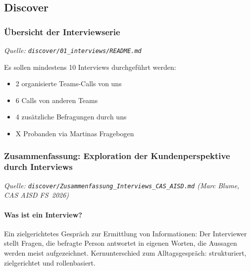 \clearpage
{}
\clearpage
{}

\clearpage
\pagecolor{anhangPastel}
\subsection{Discover}

\clearpage
{}

\clearpage
\subsubsection{Übersicht der Interviewserie}
\textit{Quelle: \texttt{discover/01\_interviews/README.md}}

\medskip
Es sollen mindestens 10 Interviews durchgeführt werden:
\begin{itemize}[nosep]
  \item 2 organisierte Teams-Calls von uns
  \item 6 Calls von anderen Teams
  \item 4 zusätzliche Befragungen durch uns
  \item X Probanden via Martinas Fragebogen
\end{itemize}

\subsubsection{Zusammenfassung: Exploration der Kundenperspektive durch Interviews}
\textit{Quelle: \texttt{discover/Zusammenfassung\_Interviews\_CAS\_AISD.md} (Marc Blume, CAS AISD FS~2026)}

\paragraph{Was ist ein Interview?}
Ein zielgerichtetes Gespräch zur Ermittlung von Informationen: Der Interviewer
stellt Fragen, die befragte Person antwortet in eigenen Worten, die Aussagen
werden meist aufgezeichnet. Kernunterschied zum Alltagsgespräch: strukturiert,
zielgerichtet und rollenbasiert.

